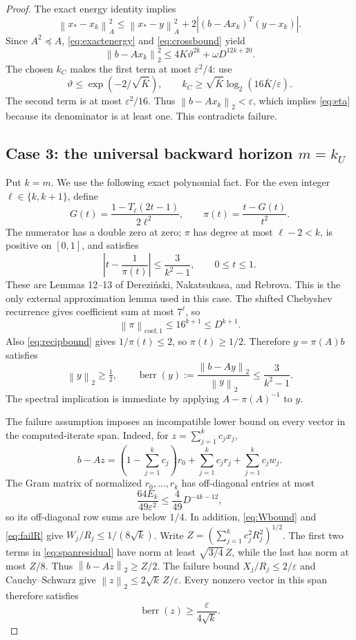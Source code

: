 \documentclass[11pt]{article}
\theoremstyle{remark}\newtheorem{remark}[theorem]{Remark}
\newcommand{\norm}[1]{\left\lVert#1\right\rVert_2}
\newcommand{\berr}{\operatorname{berr}}
\newcommand{\eps}{\varepsilon}
\newcommand{\coefnorm}[1]{\left\lVert#1\right\rVert_{\mathrm{coef},1}}
\newcommand{\energy}[1]{\left\lVert#1\right\rVert_A}
\begin{document}
\begin{proof}
The exact energy identity implies
\[
\energy{x_*-x_k}^2
\le\energy{x_*-y}^2+2|(b-Ax_k)^T(y-x_k)|.
\]
Since $A^2\preceq A$, \eqref{eq:exactenergy} and
\eqref{eq:crossbound} yield
\[
\norm{b-Ax_k}^2\le4K\vartheta^{2k}+\omega D^{12k+20}.
\]
The chosen $k_C$ makes the first term at most $\eps^2/4$:
use
\[
\vartheta\le\exp(-2/\sqrt{\bar K}),\qquad
k_C\ge\sqrt{\bar K}\log_2(16\bar K/\eps).
\]
The second term is at most $\eps^2/16$. Thus $\norm{b-Ax_k}<\eps$,
which implies \eqref{eq:eta} because its denominator is at least one.
This contradicts failure.

\subsection*{Case 3: the universal backward horizon $m=k_U$}
\label{sec:universal}
Put $k=m$. We use the following exact polynomial fact. For the even
integer $\ell\in\{k,k+1\}$, define
\begin{equation}\label{eq:reciprocalpoly}
G(t)=\frac{1-T_\ell(2t-1)}{2\ell^2},\qquad
\pi(t)=\frac{t-G(t)}{t^2}.
\end{equation}
The numerator has a double zero at zero; $\pi$ has degree at most
$\ell-2<k$, is positive on $[0,1]$, and satisfies
\begin{equation}\label{eq:recipbound}
\left|t-\frac1{\pi(t)}\right|\le\frac3{k^2-1},\qquad0\le t\le1.
\end{equation}
These are Lemmas 12--13 of Derezi\'nski, Nakatsukasa, and
Rebrova\cite{minberr}. This is the only external approximation lemma
used in this case. The shifted Chebyshev recurrence gives coefficient
sum at most $7^\ell$, so
\[
\coefnorm\pi\le16^{k+1}\le D^{k+1}.
\]
Also \eqref{eq:recipbound} gives $1/\pi(t)\le2$, so $\pi(t)\ge1/2$.
Therefore $y=\pi(A)b$ satisfies
\begin{equation}\label{eq:yberr}
\norm y\ge\tfrac12,\qquad
\berr(y):=\frac{\norm{b-Ay}}{\norm y}\le\frac3{k^2-1}.
\end{equation}
The spectral implication is immediate by applying
$A-\pi(A)^{-1}$ to $y$.

The failure assumption imposes an incompatible lower bound on every
vector in the computed-iterate span. Indeed, for
$z=\sum_{j=1}^k c_jx_j$,
\begin{equation}\label{eq:spanresidual}
b-Az=\left(1-\sum_{j=1}^k c_j\right)r_0
       +\sum_{j=1}^k c_jr_j+\sum_{j=1}^k c_jw_j.
\end{equation}
The Gram matrix of normalized $r_0,\ldots,r_k$ has off-diagonal entries
at most
\[
\frac{64E_k}{49\eps^2}\le\frac4{49}D^{-4k-12},
\]
so its off-diagonal row sums are below $1/4$.
In addition, \eqref{eq:Wbound} and \eqref{eq:failR} give
$W_j/R_j\le1/(8\sqrt k)$. Write
$Z=(\sum_{j=1}^k c_j^2R_j^2)^{1/2}$.
The first two terms in \eqref{eq:spanresidual} have norm at least
$\sqrt{3/4}\,Z$, while the last has norm at most $Z/8$.
Thus $\norm{b-Az}\ge Z/2$.
The failure bound $X_j/R_j\le2/\eps$ and Cauchy--Schwarz give
$\norm z\le2\sqrt k\,Z/\eps$. Every nonzero vector in this span
therefore satisfies
\begin{equation}\label{eq:spanberrlower}
\berr(z)\ge\frac{\eps}{4\sqrt k}.
\end{equation}


\end{proof}
\end{document}
